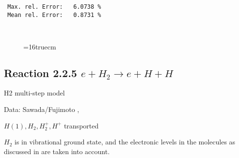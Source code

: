 \documentclass[12pt]{article}
\begin{document}
\begin{small}
\begin{verbatim}
 Max. rel. Error:   6.0738 %
 Mean rel. Error:   0.8731 %



\end{verbatim}\end{small}
\begin{figure} \label{2.1.8b}
\epsfxsize=16truecm
\end{figure}
\newpage


\subsection{
Reaction 2.2.5    $e + H_2   \rightarrow e + H + H  $
}

H2 multi-step model

 Data: Sawada/Fujimoto ,\cite{kn:Sawada}

$  H(1), H_2, H_2^+, H^+ $ transported


$H_2$ is in vibrational ground state, and the electronic levels
in the molecules as discussed in \cite{kn:Sawada} are taken into
account.
\end{document}
